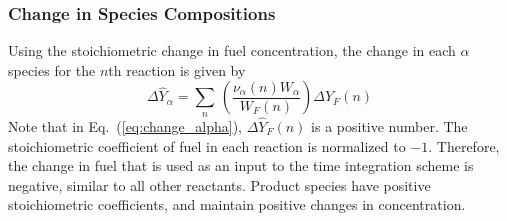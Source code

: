 \subsubsection{Change in Species Compositions}

Using the stoichiometric change in fuel concentration, the change in each $\alpha$ species for the $n$th reaction is given by
\begin{equation}\label{eq:change_alpha}
\Delta \hat{Y}_{\alpha} = \sum_n \,\left(\frac{\nu_{\alpha}(n)W_{\alpha}}{W_{F}(n)}\right)\Delta \hat{Y}_{F}(n)
\end{equation}
Note that in Eq.~(\ref{eq:change_alpha}), $\Delta \hat{Y}_{F}(n)$ is a positive number. The stoichiometric coefficient of fuel in each reaction is normalized to $-1$. Therefore, the change in fuel that is used as an input to the time integration scheme is negative, similar to all other reactants. Product species have positive stoichiometric coefficients, and maintain positive changes in concentration.

